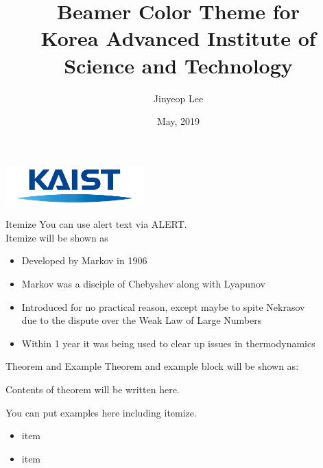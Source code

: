 \documentclass[english]{beamer} %
\begin{document}
\title[Beamer Color Theme for KAIST]{Beamer Color Theme for \\Korea Advanced Institute of Science and Technology}

\author{Jinyeop Lee}
\date{May, 2019}

\begin{frame}
  \titlepage
  \begin{center}
    \includegraphics[width=0.4\textwidth]{KAIST_logo}
  \end{center}
\end{frame}

\newcommand{\Gaussian}{\rput(0,-0.35){\psset{yunit=0.8cm,xunit=0.3}
     \psGauss[linecolor=red, linewidth=0.8pt, sigma=0.5]{-1.5}{1.5}}}
\def\dedge{\ncline[linestyle=dashed]}
\def\omitnode{\Tr*[edge=\dedge]{}}

\begin{frame}{Itemize}
You can use alert text via \alert{ALERT}.\\
Itemize will be shown as
\begin{itemize}[<+->]
\item Developed by Markov in 1906
\item Markov was a disciple of Chebyshev  along with Lyapunov
\item Introduced for no practical reason, except maybe to spite Nekrasov\\
due to the dispute over the Weak Law of Large Numbers
\item Within 1 year it was being used to clear up issues in thermodynamics
\end{itemize}
\end{frame}

\begin{frame}{Theorem and Example}
Theorem and example block will be shown as:
\begin{theorem}
	Contents of theorem will be written here.
\end{theorem}

\begin{example}
	You can put examples here including itemize.
	\begin{itemize}
		\item item
		\item item
	\end{itemize}
\end{example}
\end{frame}
\end{document}
